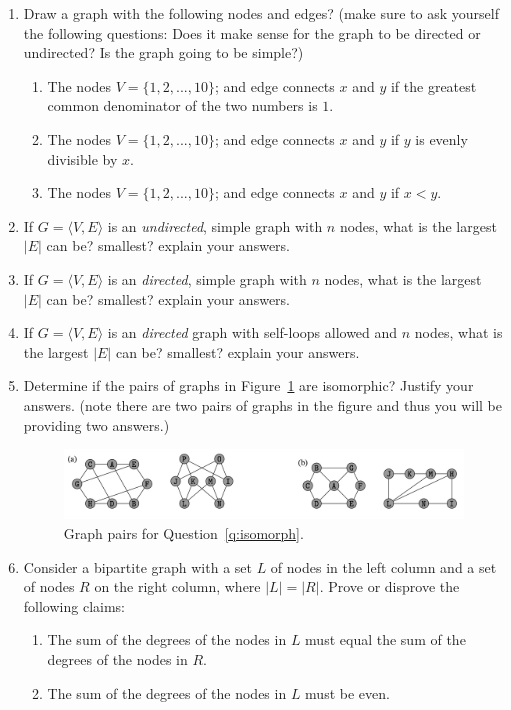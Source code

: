 \documentclass[11pt, oneside]{article}   	%
\begin{document}
\begin{enumerate}

\item Draw a graph with the following nodes and edges? 
(make sure to ask yourself the following questions: 
Does it make sense for the graph to be directed or undirected? 
Is the graph going to be simple?)
\begin{enumerate}
\item The nodes $V=\{1,2,...,10\}$; and edge connects $x$ and $y$ if the greatest common denominator of the two numbers is $1$. 
\item The nodes $V=\{1,2,...,10\}$; and edge connects $x$ and $y$ if $y$ is evenly divisible by $x$.
\item The nodes $V=\{1,2,...,10\}$; and edge connects $x$ and $y$ if $x<y$.
\end{enumerate}

\item If $G=\langle V, E \rangle$ is an \emph{undirected}, simple graph with $n$ nodes, what is the largest $|E|$ can be? smallest? explain your answers. 
\item If $G=\langle V, E \rangle$ is an \emph{directed}, simple graph with $n$ nodes, what is the largest $|E|$ can be? smallest? explain your answers.
\item If $G=\langle V, E \rangle$ is an \emph{directed} graph with self-loops allowed and $n$ nodes, what is the largest $|E|$ can be? smallest? explain your answers.

\item \label{q:isomorph} Determine if the pairs of graphs in Figure~\ref{fig:isomorph} are isomorphic? 
Justify your answers. 
(note there are two pairs of graphs in the figure and thus you will be providing two answers.)
\begin{figure}
\centering
\includegraphics[width=\textwidth]{isomorph}
\caption{Graph pairs for Question~\ref{q:isomorph}.}
\label{fig:isomorph}
\end{figure}

\item 
Consider a bipartite graph with a set $L$ of nodes in the left column and a set of nodes $R$ on the right column, where $|L| = |R|$. 
Prove or disprove the following claims:
\begin{enumerate}
\item The sum of the degrees of the nodes in $L$ must equal the sum of the degrees of the nodes in $R$.
\item The sum of the degrees of the nodes in $L$ must be even.
\end{enumerate}


\end{enumerate}
\end{document}
